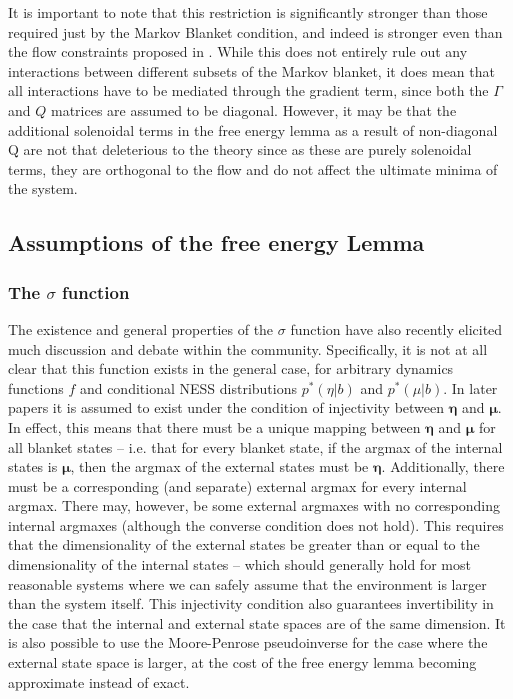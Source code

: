 It is important to note that this restriction is significantly stronger than those required just by the Markov Blanket condition, and indeed is stronger even than the flow constraints proposed in \citet{friston2020some}. While this does not entirely rule out any interactions between different subsets of the Markov blanket, it does mean that all interactions have to be mediated through the gradient term, since both the $\Gamma$ and $Q$ matrices are assumed to be diagonal. However, it may be that the additional solenoidal terms in the free energy lemma as a result of non-diagonal Q are not that deleterious to the theory since as these are purely solenoidal terms, they are orthogonal to the flow and do not affect the ultimate minima of the system.

\subsection{Assumptions of the free energy Lemma}
\subsubsection{The $\sigma$ function}

The existence and general properties of the $\sigma$ function have also recently elicited much discussion and debate within the community. Specifically, it is not at all clear that this function exists in the general case, for arbitrary dynamics functions $f$ and conditional NESS distributions $p^*(\eta | b)$ and $p^*(\mu | b)$. In later papers it is assumed to exist under the condition of injectivity between $\bm{\eta}$ and $\bm{\mu}$. In effect, this means that there must be a unique mapping between $\bm{\eta}$ and $\bm{\mu}$ for all blanket states -- i.e. that for every blanket state, if the argmax of the internal states is $\bm{\mu}$, then the argmax of the external states must be $\bm{\eta}$. Additionally, there must be a corresponding (and separate) external argmax for every internal argmax. There may, however, be some external argmaxes with no corresponding internal argmaxes (although the converse condition does not hold). This requires that the dimensionality of the external states be greater than or equal to the dimensionality of the internal states -- which should generally hold for most reasonable systems where we can safely assume that the environment is larger than the system itself. This injectivity condition also guarantees invertibility in the case that the internal and external state spaces are of the same dimension. It is also possible to use the Moore-Penrose pseudoinverse for the case where the external state space is larger, at the cost of the free energy lemma becoming approximate instead of exact.

